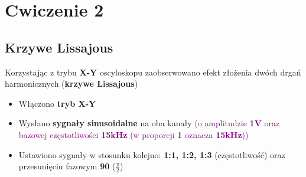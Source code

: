 \chapter{Cwiczenie 2}

\section{Krzywe Lissajous}

Korzystając z trybu \textbf{X-Y} oscyloskopu zaobserwowano efekt złożenia dwóch drgań harmonicznych (\textbf{krzywe Lissajous})

\begin{itemize}
    \item Włączono \textbf{tryb X-Y}
    \item Wysłano \textbf{sygnały sinusoidalne} na oba kanały \textcolor{purple}{(o amplitudzie \textbf{1V} oraz bazowej częstotliwości \textbf{15kHz} (w proporcji \textbf{1} oznacza \textbf{15kHz}))}
    \label{ad:dodatkowe_informacje_lissajous}
    \item Ustawiono sygnały w stosunku kolejno: \textbf{1:1, 1:2, 1:3} (częstotliwość) oraz przesunięciu fazowym \textbf{90}\boldsymbol{\degree} ($\frac{\pi}{2}$)
\end{itemize}


